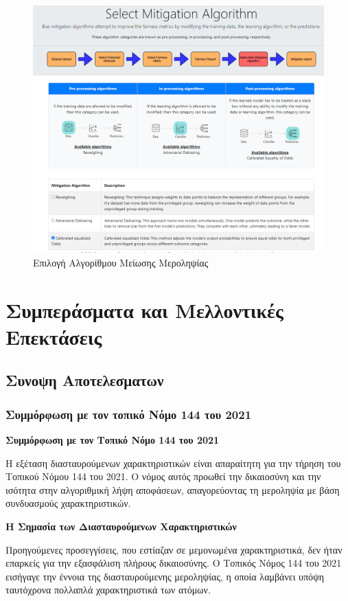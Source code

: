 \documentclass[12pt,twoside]{article}
\newcommand{\gr}{\selectlanguage{greek}}
\begin{document}
\begin{figure}[H]
\centering
\includegraphics[width=120mm]{dutch_algorithm_selection.png}
\caption{\gr Επιλογή Αλγορίθμου Μείωσης Μεροληψίας\label{overflow}}
\end{figure}


\newpage
\section{Συμπεράσματα και Μελλοντικές Επεκτάσεις}

\subsection{Συνοψη Αποτελεσματων}

\subsubsection{Συμμόρφωση με τον τοπικό Νόμο 144 του 2021}
\textbf{Συμμόρφωση με τον Τοπικό Νόμο 144 του 2021}

Η εξέταση διασταυρούμενων χαρακτηριστικών είναι απαραίτητη για την τήρηση του Τοπικού Νόμου 144 του 2021. Ο νόμος αυτός προωθεί την δικαιοσύνη και την ισότητα στην αλγοριθμική λήψη αποφάσεων, απαγορεύοντας τη μεροληψία με βάση συνδυασμούς χαρακτηριστικών.

\textbf{Η Σημασία των Διασταυρούμενων Χαρακτηριστικών}

Προηγούμενες προσεγγίσεις, που εστίαζαν σε μεμονωμένα χαρακτηριστικά, δεν ήταν επαρκείς για την εξασφάλιση πλήρους δικαιοσύνης. Ο Τοπικός Νόμος 144 του 2021 εισήγαγε την έννοια της διασταυρούμενης μεροληψίας, η οποία λαμβάνει υπόψη ταυτόχρονα πολλαπλά χαρακτηριστικά των ατόμων.
\end{document}
